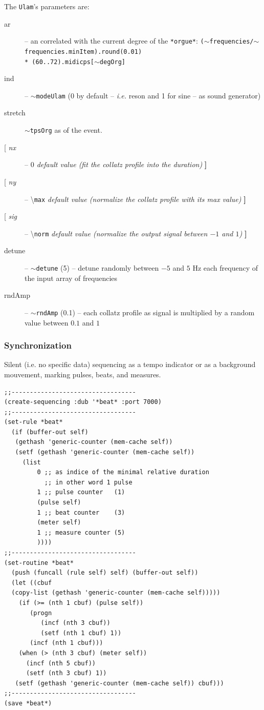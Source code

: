 \documentclass{article}
\newcommand{\myuline}[1]{%
  \uline{\phantom{#1}}%
  \llap{\contour{white}{#1}}%
}
\begin{document}
The \texttt{Ulam}'s parameters are:
\begin{description}
\item[\quad ar] -- an \myuline{array of frequencies} correlated with the current degree of the \texttt{*orgue*}: \texttt{($\sim$frequencies/$\sim$frequencies.minItem).round(0.01)\\
 * (60..72).midicps[$\sim$degOrg]}
\item[\quad ind] -- $\sim$\texttt{modeUlam} (0 by default -- \textit{i.e.} \textsf{reson} and 1 for \textsf{sine} -- as sound generator)
\item[\quad stretch] $\sim$\texttt{tpsOrg} as \myuline{duration} of the event.
\item[\quad [ \textit{nx}] -- \textit{$0$ default value (fit the collatz profile into the duration)} \textbf{]}
\item[\quad [ \textit{ny}] -- \textbackslash\texttt{max} \textit{default value (normalize the collatz profile with its max value)} \textbf{]}
\item[\quad [ \textit{sig}] -- \textbackslash\texttt{norm} \textit{default value (normalize the output signal between $-1$ and $1$)} \textbf{]}
\item[\quad detune] -- $\sim$\texttt{detune} (5) -- detune randomly between $-5$ and $5$ Hz each frequency of the input array of frequencies
\item[\quad rndAmp] -- $\sim$\texttt{rndAmp} (0.1) -- each collatz profile as signal is multiplied by a random value between $0.1$ and $1$
\end{description}

\subsubsection{Synchronization}

Silent (i.e. no specific data) sequencing as a tempo indicator or as a background mouvement, marking pulses, beats, and measures. 

\begin{lstlisting}[language=N3]
;;----------------------------------
(create-sequencing :dub '*beat* :port 7000)
;;----------------------------------
(set-rule *beat*
  (if (buffer-out self)
   (gethash 'generic-counter (mem-cache self))
   (setf (gethash 'generic-counter (mem-cache self))
	 (list
	     0 ;; as indice of the minimal relative duration
	       ;; in other word 1 pulse
	     1 ;; pulse counter   (1)
	     (pulse self)
	     1 ;; beat counter    (3)
	     (meter self)
	     1 ;; measure counter (5)
	     ))))
;;----------------------------------	     
(set-routine *beat* 
  (push (funcall (rule self) self) (buffer-out self))
  (let ((cbuf 
  (copy-list (gethash 'generic-counter (mem-cache self)))))
    (if (>= (nth 1 cbuf) (pulse self))
       (progn
          (incf (nth 3 cbuf))
          (setf (nth 1 cbuf) 1))
       (incf (nth 1 cbuf)))
    (when (> (nth 3 cbuf) (meter self))
      (incf (nth 5 cbuf))
      (setf (nth 3 cbuf) 1))
   (setf (gethash 'generic-counter (mem-cache self)) cbuf)))
;;----------------------------------
(save *beat*)
\end{lstlisting}
\end{document}
